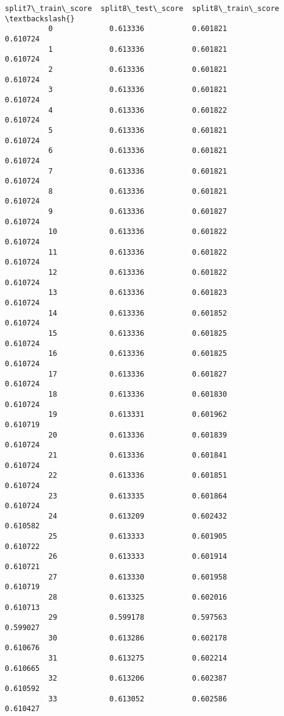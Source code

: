 \documentclass[11pt]{article}
\begin{document}
\begin{Verbatim}[commandchars=\\\{\}]
              split7\_train\_score  split8\_test\_score  split8\_train\_score  \textbackslash{}
          0             0.613336           0.601821            0.610724   
          1             0.613336           0.601821            0.610724   
          2             0.613336           0.601821            0.610724   
          3             0.613336           0.601821            0.610724   
          4             0.613336           0.601822            0.610724   
          5             0.613336           0.601821            0.610724   
          6             0.613336           0.601821            0.610724   
          7             0.613336           0.601821            0.610724   
          8             0.613336           0.601821            0.610724   
          9             0.613336           0.601827            0.610724   
          10            0.613336           0.601822            0.610724   
          11            0.613336           0.601822            0.610724   
          12            0.613336           0.601822            0.610724   
          13            0.613336           0.601823            0.610724   
          14            0.613336           0.601852            0.610724   
          15            0.613336           0.601825            0.610724   
          16            0.613336           0.601825            0.610724   
          17            0.613336           0.601827            0.610724   
          18            0.613336           0.601830            0.610724   
          19            0.613331           0.601962            0.610719   
          20            0.613336           0.601839            0.610724   
          21            0.613336           0.601841            0.610724   
          22            0.613336           0.601851            0.610724   
          23            0.613335           0.601864            0.610724   
          24            0.613209           0.602432            0.610582   
          25            0.613333           0.601905            0.610722   
          26            0.613333           0.601914            0.610721   
          27            0.613330           0.601958            0.610719   
          28            0.613325           0.602016            0.610713   
          29            0.599178           0.597563            0.599027   
          30            0.613286           0.602178            0.610676   
          31            0.613275           0.602214            0.610665   
          32            0.613206           0.602387            0.610592   
          33            0.613052           0.602586            0.610427   

\end{Verbatim}
\end{document}
